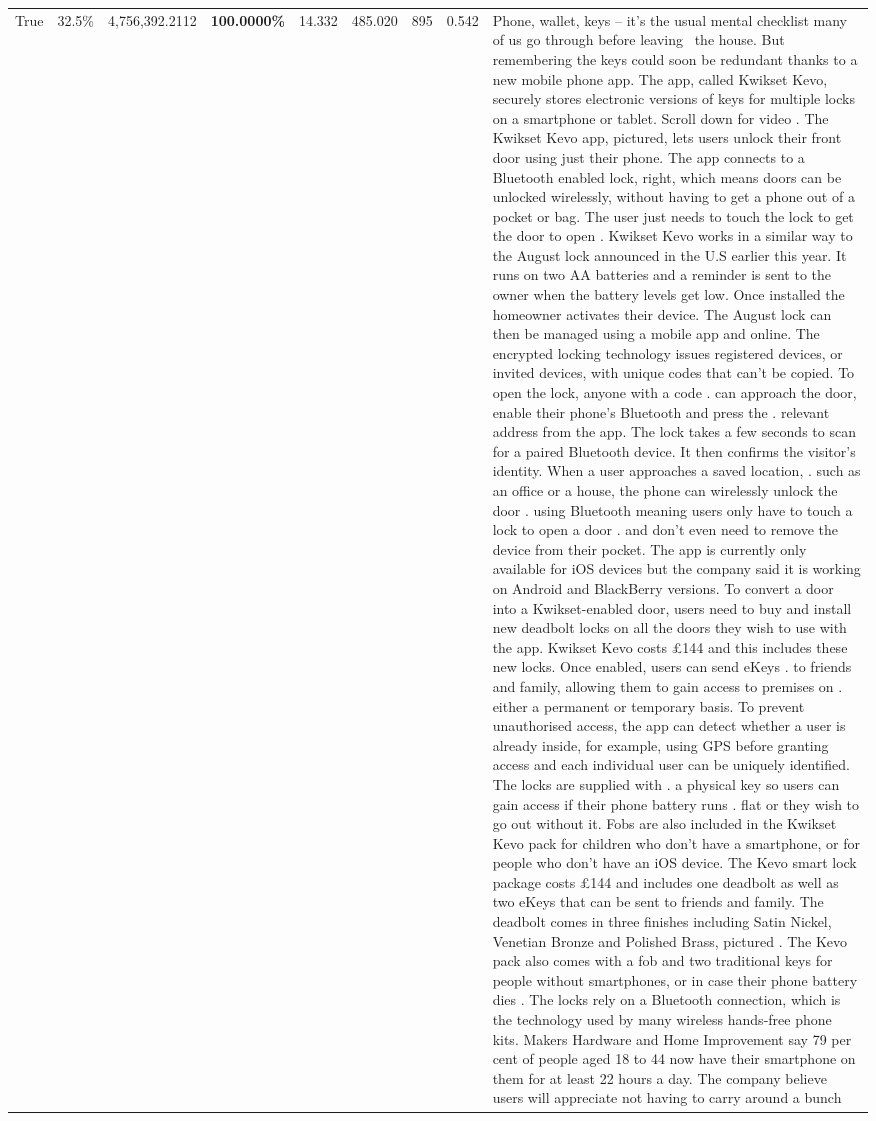 \begin{table}[H]
\begin{tabular}{lllrlllll}
True & 32.5\% & 4,756,392.2112 & \bfseries \color{red} 100.0000\% & 14.332 & 485.020 & 895 & 0.542 & Phone, wallet, keys – it’s the usual mental checklist many of us go through before leaving  the house. But remembering the keys could soon be redundant thanks to a new mobile phone app. The app, called Kwikset Kevo, securely stores electronic versions of keys for multiple locks on a smartphone or tablet. Scroll down for video . The Kwikset Kevo app, pictured, lets users unlock their front door using just their phone. The app connects to a Bluetooth enabled lock, right, which means doors can be unlocked wirelessly, without having to get a phone out of a pocket or bag. The user just needs to touch the lock to get the door to open . Kwikset Kevo works in a similar way to the August lock announced in the U.S earlier this year. It runs on two AA batteries and a reminder is sent to the owner when the battery levels get low. Once installed the homeowner activates their device. The August lock can then be managed using a mobile app and online. The encrypted locking technology issues registered devices, or invited devices, with unique codes that can't be copied. To open the lock, anyone with a code . can approach the door, enable their phone's Bluetooth and press the . relevant address from the app. The lock takes a few seconds to scan for a paired Bluetooth device. It then confirms the visitor's identity. When a user approaches a saved location, . such as an office or a house, the phone can wirelessly unlock the door . using Bluetooth meaning users only have to touch a lock to open a door . and don't even need to remove the device from their pocket. The app is currently only available for iOS devices but the company said it is working on Android and BlackBerry versions. To convert a door into a Kwikset-enabled door, users need to buy and install new deadbolt locks on all the doors they wish to use with the app. Kwikset Kevo costs £144 and this includes these new locks. Once enabled, users can send eKeys . to friends and family, allowing them to gain access to premises on . either a permanent or temporary basis. To prevent unauthorised access, the app can detect whether a user is already inside, for example, using GPS before granting access and each individual user can be uniquely identified. The locks are supplied with . a physical key so users can gain access if their phone battery runs . flat or they wish to go out without it. Fobs are also included in the Kwikset Kevo pack for children who don't have a smartphone, or for people who don't have an iOS device. The Kevo smart lock package costs £144 and includes one deadbolt as well as two eKeys that can be sent to friends and family. The deadbolt comes in three finishes including Satin Nickel, Venetian Bronze and Polished Brass, pictured . The Kevo pack also comes with a fob and two traditional keys for people without smartphones, or in case their phone battery dies . The locks rely on a Bluetooth connection, which is the technology used by many wireless hands-free phone kits. Makers Hardware and Home Improvement say 79 per cent of people aged 18 to 44 now have their smartphone on them for at least 22 hours a day. The company believe users will appreciate not having to carry around a bunch 
\end{tabular}
\end{table}
